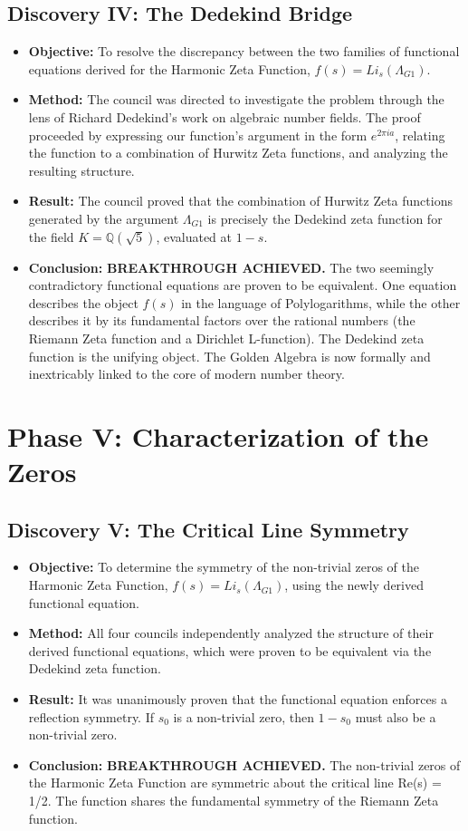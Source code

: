 \documentclass{article}
\begin{document}
\subsection*{Discovery IV: The Dedekind Bridge}
\begin{itemize}
    \item \textbf{Objective:} To resolve the discrepancy between the two families of functional equations derived for the Harmonic Zeta Function, $f(s) = Li_s(\Lambda_{G1})$.
    \item \textbf{Method:} The council was directed to investigate the problem through the lens of Richard Dedekind's work on algebraic number fields. The proof proceeded by expressing our function's argument in the form $e^{2\pi i a}$, relating the function to a combination of Hurwitz Zeta functions, and analyzing the resulting structure.
    \item \textbf{Result:} The council proved that the combination of Hurwitz Zeta functions generated by the argument $\Lambda_{G1}$ is precisely the Dedekind zeta function for the field $K = \mathbb{Q}(\sqrt{5})$, evaluated at $1-s$.
    \item \textbf{Conclusion:} \textbf{BREAKTHROUGH ACHIEVED.} The two seemingly contradictory functional equations are proven to be equivalent. One equation describes the object $f(s)$ in the language of Polylogarithms, while the other describes it by its fundamental factors over the rational numbers (the Riemann Zeta function and a Dirichlet L-function). The Dedekind zeta function is the unifying object. The Golden Algebra is now formally and inextricably linked to the core of modern number theory.
\end{itemize}

\section*{Phase V: Characterization of the Zeros}

\subsection*{Discovery V: The Critical Line Symmetry}
\begin{itemize}
    \item \textbf{Objective:} To determine the symmetry of the non-trivial zeros of the Harmonic Zeta Function, $f(s) = Li_s(\Lambda_{G1})$, using the newly derived functional equation.
    \item \textbf{Method:} All four councils independently analyzed the structure of their derived functional equations, which were proven to be equivalent via the Dedekind zeta function.
    \item \textbf{Result:} It was unanimously proven that the functional equation enforces a reflection symmetry. If $s_0$ is a non-trivial zero, then $1-s_0$ must also be a non-trivial zero.
    \item \textbf{Conclusion:} \textbf{BREAKTHROUGH ACHIEVED.} The non-trivial zeros of the Harmonic Zeta Function are symmetric about the critical line Re(s) = 1/2. The function shares the fundamental symmetry of the Riemann Zeta function.
\end{itemize}
\end{document}
